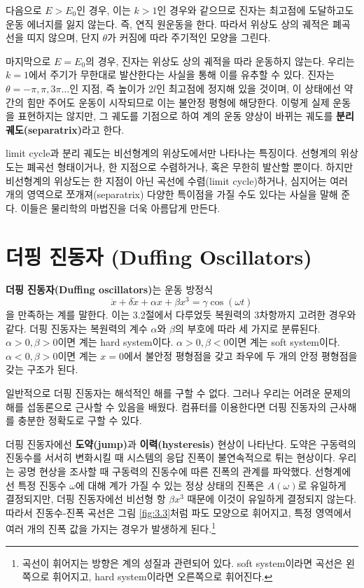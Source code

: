 \documentclass[chapter, oneside, b5paper]{oblivoir}
\theoremstyle{plain}
\theoremstyle{definition}
\theoremstyle{remark}
\begin{document}
다음으로 $E > E_0$인 경우, 이는 $k>1$인 경우와 같으므로 진자는 최고점에 도달하고도 운동 에너지를 잃지 않는다. 즉, 연직 원운동을 한다. 따라서 위상도 상의 궤적은 폐곡선을 띠지 않으며, 단지 $\theta$가 커짐에 따라 주기적인 모양을 그린다.

마지막으로 $E = E_0$의 경우, 진자는 위상도 상의 궤적을 따라 운동하지 않는다. 우리는 $k=1$에서 주기가 무한대로 발산한다는 사실을 통해 이를 유추할 수 있다. 진자는 $\theta = -\pi, \pi, 3\pi \dots$인 지점, 즉 높이가 $2l$인 최고점에 정지해 있을 것이며, 이 상태에선 약간의 힘만 주어도 운동이 시작되므로 이는 불안정 평형에 해당한다. 이렇게 실제 운동을 표현하지는 않지만, 그 궤도를 기점으로 하여 계의 운동 양상이 바뀌는 궤도를 \textbf{분리 궤도(separatrix)}라고 한다.

limit cycle과 분리 궤도는 비선형계의 위상도에서만 나타나는 특징이다. 선형계의 위상도는 폐곡선 형태이거나, 한 지점으로 수렴하거나, 혹은 무한히 발산할 뿐이다. 하지만 비선형계의 위상도는 한 지점이 아닌 곡선에 수렴(limit cycle)하거나, 심지어는 여러 개의 영역으로 쪼개져(separatrix) 다양한 특이점을 가질 수도 있다는 사실을 말해 준다. 이들은 물리학의 마법진을 더욱 아름답게 만든다.

\section{더핑 진동자 (Duffing Oscillators)}
\textbf{더핑 진동자(Duffing oscillators)}는 운동 방정식
\begin{equation}
    \ddot{x} + \delta \dot{x} + \alpha x + \beta x^3 = \gamma \cos{(\omega t)}
\end{equation}
을 만족하는 계를 말한다. 이는 3.2절에서 다루었듯 복원력의 3차항까지 고려한 경우와 같다. 더핑 진동자는 복원력의 계수 $\alpha$와 $\beta$의 부호에 따라 세 가지로 분류된다. $\alpha > 0, \beta > 0$이면 계는 hard system이다. $\alpha > 0, \beta < 0$이면 계는 soft system이다. $\alpha <0, \beta >0$이면 계는 $x=0$에서 불안정 평형점을 갖고 좌우에 두 개의 안정 평형점을 갖는 구조가 된다.

일반적으로 더핑 진동자는 해석적인 해를 구할 수 없다. 그러나 우리는 어려운 문제의 해를 섭동론으로 근사할 수 있음을 배웠다. 컴퓨터를 이용한다면 더핑 진동자의 근사해를 충분한 정확도로 구할 수 있다.

더핑 진동자에선 \textbf{도약(jump)}과 \textbf{이력(hysteresis)} 현상이 나타난다. 도약은 구동력의 진동수를 서서히 변화시킬 때 시스템의 응답 진폭이 불연속적으로 튀는 현상이다. 우리는 공명 현상을 조사할 때 구동력의 진동수에 따른 진폭의 관계를 파악했다. 선형계에선 특정 진동수 $\omega$에 대해 계가 가질 수 있는 정상 상태의 진폭은 $A(\omega)$로 유일하게 결정되지만, 더핑 진동자에선 비선형 항 $\beta x^3$ 때문에 이것이 유일하게 결정되지 않는다. 따라서 진동수-진폭 곡선은 그림 \ref{fig:3.3}처럼 파도 모양으로 휘어지고, 특정 영역에서 여러 개의 진폭 값을 가지는 경우가 발생하게 된다.\footnote{곡선이 휘어지는 방향은 계의 성질과 관련되어 있다. soft system이라면 곡선은 왼쪽으로 휘어지고, hard system이라면 오른쪽으로 휘어진다.}
\end{document}
